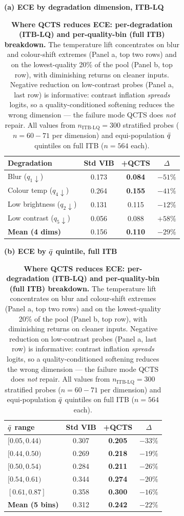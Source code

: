\begin{table}[!t]
\centering
\caption{\textbf{Where QCTS reduces ECE: per-degradation (ITB-LQ) and per-quality-bin (full ITB) breakdown.}
The temperature lift concentrates on blur and colour-shift extremes (Panel a, top two rows) and on the lowest-quality 20\% of the pool (Panel b, top row), with diminishing returns on cleaner inputs. Negative reduction on low-contrast probes (Panel a, last row) is informative: contrast inflation \emph{spreads} logits, so a quality-conditioned soften\-ing reduces the wrong dimension --- the failure mode QCTS does \emph{not} repair. All values from $n_{\text{ITB-LQ}}{=}300$ stratified probes ($n{=}60{-}71$ per dimension) and equi-population $\bar{q}$ quintiles on full ITB ($n{=}564$ each).}
\label{tab:perdeg}
\vspace{4pt}
\footnotesize
\setlength{\tabcolsep}{5pt}
\renewcommand{\arraystretch}{1.06}
\begin{minipage}[t]{0.48\linewidth}
\centering
\textbf{(a) ECE by degradation dimension, ITB-LQ}\par\vspace{2pt}
\begin{tabular}{lccc}
\toprule
Degradation & Std VIB & +QCTS & $\Delta$ \\
\midrule
Blur ($q_1\!\downarrow$)         & 0.173 & \textbf{0.084} & $-51\%$ \\
Colour temp ($q_4\!\downarrow$)  & 0.264 & \textbf{0.155} & $-41\%$ \\
Low brightness ($q_2\!\downarrow$) & 0.131 & 0.115 & $-12\%$ \\
Low contrast ($q_5\!\downarrow$) & 0.056 & 0.088 & $+58\%$ \\
\midrule
\textbf{Mean (4 dims)} & 0.156 & \textbf{0.110} & $-29\%$ \\
\bottomrule
\end{tabular}
\end{minipage}\hfill
\begin{minipage}[t]{0.48\linewidth}
\centering
\textbf{(b) ECE by $\bar{q}$ quintile, full ITB}\par\vspace{2pt}
\begin{tabular}{lccc}
\toprule
$\bar{q}$ range & Std VIB & +QCTS & $\Delta$ \\
\midrule
$[0.05, 0.44)$ & 0.307 & \textbf{0.205} & $-33\%$ \\
$[0.44, 0.50)$ & 0.269 & \textbf{0.218} & $-19\%$ \\
$[0.50, 0.54)$ & 0.284 & \textbf{0.211} & $-26\%$ \\
$[0.54, 0.61)$ & 0.344 & \textbf{0.274} & $-20\%$ \\
$[0.61, 0.87]$ & 0.358 & \textbf{0.300} & $-16\%$ \\
\midrule
\textbf{Mean (5 bins)} & 0.312 & \textbf{0.242} & $-22\%$ \\
\bottomrule
\end{tabular}
\end{minipage}
\end{table}
